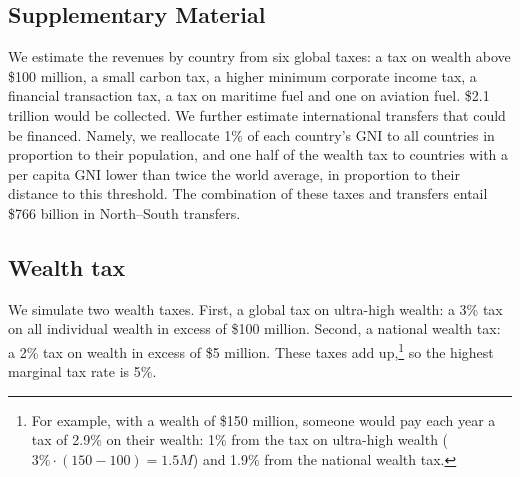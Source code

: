 \documentclass[12pt,english]{article}
\begin{document}
\begin{bibunit}

\appendix
\clearpage
\section*{Supplementary Material}

  We estimate the revenues by country from six global taxes: a tax on wealth above \$100 million, a small carbon tax, a higher minimum corporate income tax, %
  a financial transaction tax, a tax on maritime fuel and one on aviation fuel. \$2.1 trillion would be collected. %
  We further estimate international transfers that could be financed.  %
  Namely, we reallocate 1\% of each country's GNI to all countries in proportion to their %
  population, and one half of the wealth tax to countries with a per capita GNI lower than twice the world average, in proportion to their distance to this threshold. The combination of these taxes and transfers entail \$766 billion in North--South transfers.  


\subsection*{Wealth tax}\label{sec:wealth}


We simulate two wealth taxes. First, a global tax on ultra-high wealth: a 3\% tax on all individual wealth in excess of \$100 million. Second, a national wealth tax: a 2\% tax on wealth in excess of \$5 million. These taxes add up,\footnote{For example, with a wealth of \$150 million, someone would pay each year a tax of 2.9\% on their wealth: 1\% from the tax on ultra-high wealth ($3\% \cdot \left(150-100\right)=1.5M$) and 1.9\% from the national wealth tax.%
} so the highest marginal tax rate is 5\%.



\end{bibunit}
\end{document}

